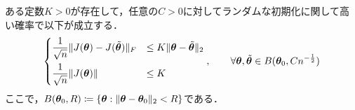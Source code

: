 \begin{lem}[Jacobianの局所リプシッツ性]
    \label{jacob_local_lipschitz}
    ある定数$K>0$が存在して，任意の$C>0$に対してランダムな初期化に関して高い確率で以下が成立する．
    \begin{align}
        \label{eq:l1_1}
        \begin{dcases}
            \dfrac{1}{\sqrt{n}}\|J(\bm{\theta}) - J(\tilde{\bm{\theta}})\|_F &\leq K\|\bm{\theta} - \tilde{\bm{\theta}}\|_2 \\
            \dfrac{1}{\sqrt{n}}\|J(\bm{\theta})\| &\leq K
        \end{dcases}
        , \qquad \forall\bm{\theta}, \tilde{\bm{\theta}} \in B(\bm{\theta}_0, Cn^{-\frac{1}{2}})
    \end{align}
    ここで，$B(\bm{\theta}_0, R) \coloneqq \left\{\bm{\theta}:\|\bm{\theta} - \bm{\theta}_0\|_2 < R\right\}$である．
\end{lem}
